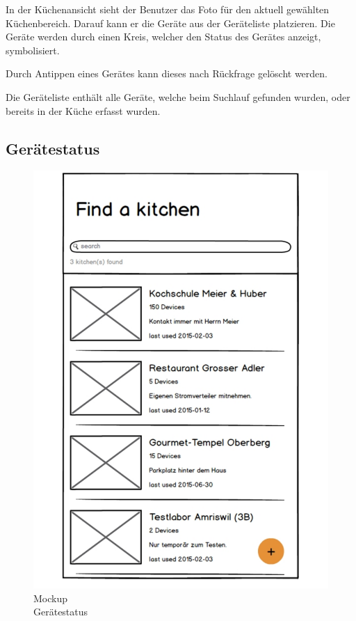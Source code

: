 In der Küchenansicht sieht der Benutzer das Foto für den aktuell gewählten Küchenbereich. Darauf kann er die Geräte aus der Geräteliste platzieren. Die Geräte werden durch einen Kreis, welcher den Status des Gerätes anzeigt, symbolisiert.

Durch Antippen eines Gerätes kann dieses nach Rückfrage gelöscht werden.

Die Geräteliste enthält alle Geräte, welche beim Suchlauf gefunden wurden, oder bereits in der Küche erfasst wurden.

\WFclear

\subsection{Gerätestatus}
\label{subsec:Gerätestatus}

\begin{figure}
	\begin{center}
		\vspace{-1cm}
		\includegraphics[page=5,trim=0 0 0 0,clip,scale=0.21]{uiux/res/mockups}
		\caption{Mockup\\Gerätestatus}
		\label{abb:mockDeviceDetail}
	\end{center}
\end{figure}

